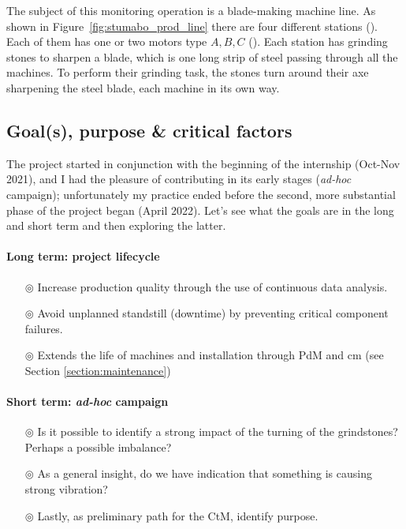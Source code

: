 The subject of this monitoring operation is a blade-making machine line.
As shown in Figure~\ref{fig:stumabo_prod_line} there are four different stations (). Each of them has one or two motors type ${A,B,C}$ ().
Each station has grinding stones to sharpen a blade, which is one long strip of steel passing through all the machines.
To perform their grinding task, the stones turn around their axe sharpening the steel blade, each machine in its own way.


\subsection{Goal(s), purpose \& critical factors}
The project started in conjunction with the beginning of the internship (Oct-Nov 2021), and I had the pleasure of contributing in its early stages (\textit{ad-hoc} campaign);
unfortunately my practice ended before the second, more substantial phase of the project began (April 2022).
Let's see what the goals are in the long and short term and then exploring the latter.
\paragraph{Long term: project lifecycle}
\begin{itemize}
    \item[$\circledcirc$] Increase production quality through the use of continuous data analysis.
    \item[$\circledcirc$] Avoid unplanned standstill (downtime) by preventing critical component failures.
    \item[$\circledcirc$] Extends the life of machines and installation through \acl{PdM} and \acl{cm} (see Section \ref{section:maintenance})
\end{itemize}
\paragraph{Short term: \textit{ad-hoc} campaign}
\begin{itemize}
    \item[$\circledcirc$] Is  it possible to identify a strong impact of the turning of the grindstones? Perhaps a possible imbalance?
    \item[$\circledcirc$] As a general insight, do we have indication that something is causing strong vibration?
    \item[$\circledcirc$] Lastly, as preliminary path for the \ac{CtM}, identify purpose. 
\end{itemize}

